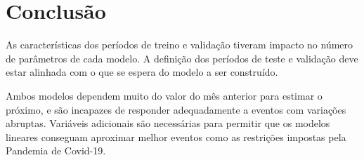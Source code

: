 \documentclass[final,5p]{elsarticle}
\numberwithin{equation}{section}
\begin{document}
\section{Conclusão}

    As características dos períodos de treino e validação tiveram impacto no número de parâmetros de cada modelo. A definição dos períodos de teste e validação deve estar alinhada com o que se espera do modelo a ser construído.

    Ambos modelos dependem muito do valor do mês anterior para estimar o próximo, e são incapazes de responder adequadamente a eventos com variações abruptas. Variáveis adicionais são necessárias para permitir que os modelos lineares conseguam aproximar melhor eventos como as restrições impostas pela Pandemia de Covid-19.


\appendix















\end{document}
